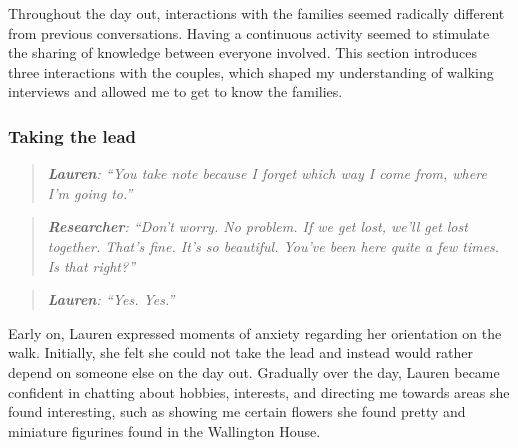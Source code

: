 Throughout the day out, interactions with the families seemed radically different from previous conversations. Having a continuous activity seemed to stimulate the sharing of knowledge between everyone involved. This section introduces three interactions with the couples, which shaped my understanding of walking interviews and allowed me to get to know the families.


\subsubsection{Taking the lead}
\begin{quote}
\textit{   \textbf{Lauren}: ``You take note because I forget which way I come from, where I'm going to.''
}\end{quote}

\begin{quote}    
\textit{    \textbf{Researcher}: ``Don't worry. No problem. If we get lost, we'll get lost together. That's fine. It's so beautiful. You've been here quite a few times. Is that right?''
}    \end{quote}
    \begin{quote}    

\textit{    \textbf{Lauren}: ``Yes. Yes.''
}\end{quote}

Early on, Lauren expressed moments of anxiety regarding her orientation on the walk. Initially, she felt she could not take the lead and instead would rather depend on someone else on the day out. Gradually over the day, Lauren became confident in chatting about hobbies, interests, and directing me towards areas she found interesting, such as showing me certain flowers she found pretty and miniature figurines found in the Wallington House.

